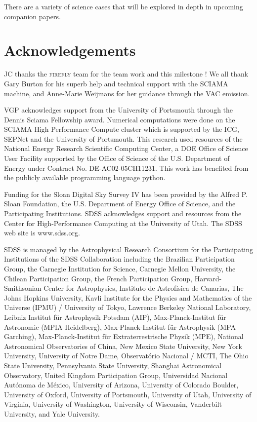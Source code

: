 \documentclass[onecolumn]{aa}
\begin{document}
There are a variety of science cases that will be explored in depth in upcoming companion papers. 
 
\section{Acknowledgements}
JC thanks the \textsc{firefly} team for the team work and this milestone ! 
We all thank Gary Burton for his superb help and technical support with the SCIAMA machine, and Anne-Marie Weijmans for her guidance through the VAC emission.

VGP acknowledges support from the University of Portsmouth through the Dennis Sciama Fellowship award. 
Numerical computations were done on the SCIAMA High Performance Compute cluster which is supported by the ICG, SEPNet and the University of Portsmouth. 
This research used resources of the National Energy Research Scientific Computing Center, a DOE Office of Science User Facility supported by the Office of Science of the U.S. 
Department of Energy under Contract No. DE-AC02-05CH11231. 
This work has benefited from the publicly available programming language {\sc python}.

Funding for the Sloan Digital Sky Survey IV has been provided by the Alfred P. Sloan Foundation, the U.S. Department of Energy Office of Science, and the Participating Institutions. SDSS acknowledges support and resources from the Center for High-Performance Computing at the University of Utah. The SDSS web site is www.sdss.org.

SDSS is managed by the Astrophysical Research Consortium for the Participating Institutions of the SDSS Collaboration including the Brazilian Participation Group, the Carnegie Institution for Science, Carnegie Mellon University, the Chilean Participation Group, the French Participation Group, Harvard-Smithsonian Center for Astrophysics, Instituto de Astrof\'{i}sica de Canarias, The Johns Hopkins University, Kavli Institute for the Physics and Mathematics of the Universe (IPMU) / University of Tokyo, Lawrence Berkeley National Laboratory, Leibniz Institut für Astrophysik Potsdam (AIP), Max-Planck-Institut für Astronomie (MPIA Heidelberg), Max-Planck-Institut für Astrophysik (MPA Garching), Max-Planck-Institut für Extraterrestrische Physik (MPE), National Astronomical Observatories of China, New Mexico State University, New York University, University of Notre Dame, Observatório Nacional / MCTI, The Ohio State University, Pennsylvania State University, Shanghai Astronomical Observatory, United Kingdom Participation Group, Universidad Nacional Autónoma de México, University of Arizona, University of Colorado Boulder, University of Oxford, University of Portsmouth, University of Utah, University of Virginia, University of Washington, University of Wisconsin, Vanderbilt University, and Yale University.
\end{document}
